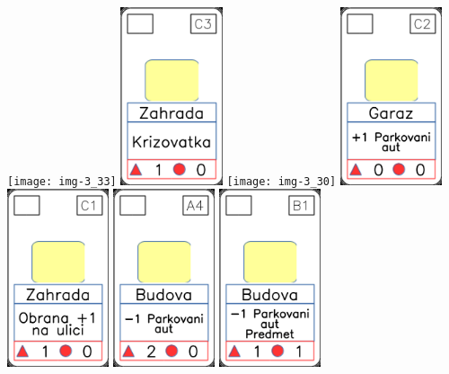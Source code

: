 \documentclass[a4paper]{article}
\begin{document}
	\texttt{[image: img-3\_33]}
	\includegraphics[width=3.0cm]{img-3_27}
	\texttt{[image: img-3\_30]}
	\includegraphics[width=3.0cm]{img-2_11}
	\includegraphics[width=3.0cm]{img-2_25}
	\includegraphics[width=3.0cm]{img-2_3}
	\includegraphics[width=3.0cm]{img-2_5}
\end{document}
